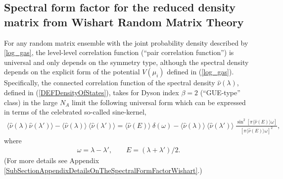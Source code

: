 \documentclass[aps,prb,preprint,onecolumn,amsmath,amssymb,superscriptaddress,eqsecnum,floatfix,scrartcl]{revtex4-1}
\begin{document}

\subsection{Spectral form factor for the  reduced density matrix 	from Wishart Random Matrix Theory}
\label{SubSectionSpectralFormFactorReducedDensityMatrix}
For any  random matrix ensemble with the joint probability density described by \eqref{log_gas}, the level-level correlation function 
(``pair correlation function'') is universal and only depends\cite{Nagao1992,BREZIN1993}
 on the symmetry type, although the spectral density depends on the explicit form of the potential $V(\mu_i)$ defined in  (\ref{log_gas}). Specifically,
the connected  correlation function
of the 
spectral density ${\hat \nu}(\lambda)$,
 defined in (\ref{DEFDensityOfStates}),
takes  for  Dyson index $\beta=2$ (``GUE-type'' class)   in the large $N_A$ limit  the following universal form which
can be expressed in terms of the celebrated so-called sine-kernel\cite{Fox1964,Nagao1992,BREZIN1993},
\begin{align}
\langle {\hat \nu}(\lambda){ \hat \nu}(\lambda')\rangle-\langle {\hat \nu}(\lambda)\rangle \ \langle{\hat \nu}(\lambda')\rangle
=\langle {\hat \nu}(E)\rangle \ \delta(\omega)-\langle{\hat \nu}(\lambda)\rangle \ \langle{\hat \nu}(\lambda')\rangle \ 
\frac{\sin^2[\pi\langle{\hat \nu}(E)\rangle \omega]}{[\pi\langle{\hat \nu}(E)\rangle \omega]^2},
\label{pair_corr}
\end{align}
where 
\begin{eqnarray}
\label{DEFOmegaE}
\omega=\lambda-\lambda', \qquad  E=(\lambda+\lambda')/2.
\end{eqnarray}
(For more details see Appendix \ref{SubSectionAppendixDetailsOnTheSpectralFormFactorWishart}.)
\end{document}
